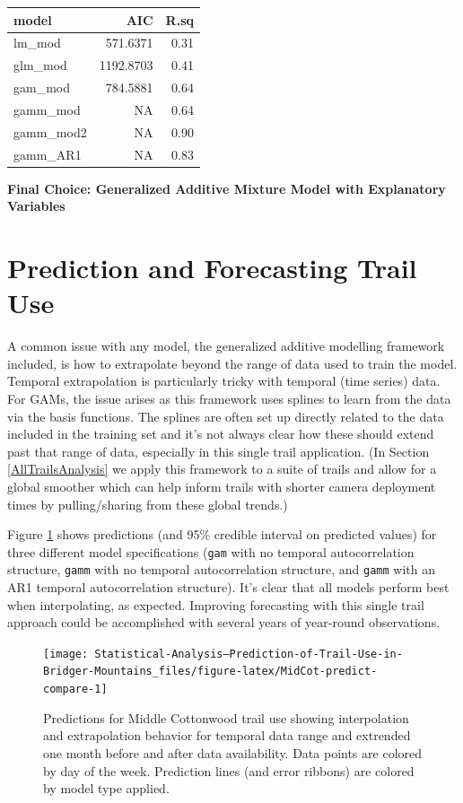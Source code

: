 \documentclass[
]{book}
\begin{document}
\begin{tabular}{lrr}
\toprule
model & AIC & R.sq\\
\midrule
lm\_mod & 571.6371 & 0.31\\
glm\_mod & 1192.8703 & 0.41\\
gam\_mod & 784.5881 & 0.64\\
gamm\_mod & NA & 0.64\\
gamm\_mod2 & NA & 0.90\\
\addlinespace
gamm\_AR1 & NA & 0.83\\
\bottomrule
\end{tabular}

\textbf{Final Choice: Generalized Additive Mixture Model with Explanatory Variables}

\hypertarget{MidCotPred}{%
\section{Prediction and Forecasting Trail Use}\label{MidCotPred}}

A common issue with any model, the generalized additive modelling framework included, is how to extrapolate beyond the range of data used to train the model. Temporal extrapolation is particularly tricky with temporal (time series) data. For GAMs, the issue arises as this framework uses splines to learn from the data via the basis functions. The splines are often set up directly related to the data included in the training set and it's not always clear how these should extend past that range of data, especially in this single trail application. (In Section \ref{AllTrailsAnalysis} we apply this framework to a suite of trails and allow for a global smoother which can help inform trails with shorter camera deployment times by pulling/sharing from these global trends.)

Figure \ref{fig:MidCot-predict-compare} shows predictions (and 95\% credible interval on predicted values) for three different model specifications (\texttt{gam} with no temporal autocorrelation structure, \texttt{gamm} with no temporal autocorrelation structure, and \texttt{gamm} with an AR1 temporal autocorrelation structure). It's clear that all models perform best when interpolating, as expected. Improving forecasting with this single trail approach could be accomplished with several years of year-round observations.

\begin{figure}

{\centering \texttt{[image: Statistical-Analysis--Prediction-of-Trail-Use-in-Bridger-Mountains\_files/figure-latex/MidCot-predict-compare-1]} 

}

\caption{Predictions for Middle Cottonwood trail use showing interpolation and extrapolation behavior for temporal data range and extrended one month before and after data availability. Data points are colored by day of the week. Prediction lines (and error ribbons) are colored by model type applied.}\label{fig:MidCot-predict-compare}
\end{figure}
\end{document}
